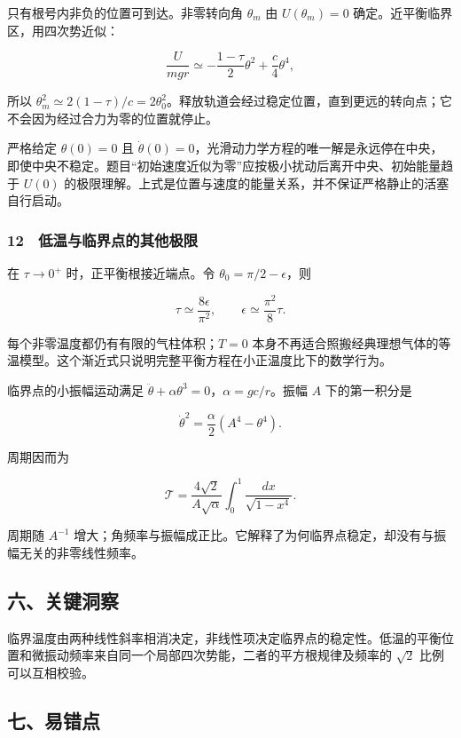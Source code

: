 \documentclass[12pt,a4paper,fontset=fandol]{ctexart}
\begin{document}
只有根号内非负的位置可到达。非零转向角 \(\theta_m\) 由 \(U(\theta_m)=0\)
确定。近平衡临界区，用四次势近似：

\[\frac{U}{mgr}\simeq-\frac{1-\tau}{2}\theta^2+\frac c4\theta^4,\]

所以
\(\theta_m^2\simeq2(1-\tau)/c=2\theta_0^2\)。释放轨道会经过稳定位置，直到更远的转向点；它不会因为经过合力为零的位置就停止。

严格给定 \(\theta(0)=0\) 且
\(\dot\theta(0)=0\)，光滑动力学方程的唯一解是永远停在中央，即使中央不稳定。题目``初始速度近似为零''应按极小扰动后离开中央、初始能量趋于
\(U(0)\)
的极限理解。上式是位置与速度的能量关系，并不保证严格静止的活塞自行启动。

\subsubsection{12　低温与临界点的其他极限}\label{ux4f4eux6e29ux4e0eux4e34ux754cux70b9ux7684ux5176ux4ed6ux6781ux9650}

在 \(\tau\to0^+\) 时，正平衡根接近端点。令
\(\theta_0=\pi/2-\epsilon\)，则

\[\tau\simeq\frac{8\epsilon}{\pi^2},\qquad
\epsilon\simeq\frac{\pi^2}{8}\tau.\]

每个非零温度都仍有有限的气柱体积；\(T=0\)
本身不再适合照搬经典理想气体的等温模型。这个渐近式只说明完整平衡方程在小正温度比下的数学行为。

临界点的小振幅运动满足
\(\ddot\theta+\alpha\theta^3=0\)，\(\alpha=gc/r\)。振幅 \(A\)
下的第一积分是

\[\dot\theta^2=\frac\alpha2(A^4-\theta^4).\]

周期因而为

\[\mathcal T=\frac{4\sqrt2}{A\sqrt\alpha}
\int_0^1\frac{dx}{\sqrt{1-x^4}}.\]

周期随 \(A^{-1}\)
增大；角频率与振幅成正比。它解释了为何临界点稳定，却没有与振幅无关的非零线性频率。

\subsection{六、关键洞察}\label{ux516dux5173ux952eux6d1eux5bdf-1}

临界温度由两种线性斜率相消决定，非线性项决定临界点的稳定性。低温的平衡位置和微振动频率来自同一个局部四次势能，二者的平方根规律及频率的
\(\sqrt2\) 比例可以互相校验。

\subsection{七、易错点}\label{ux4e03ux6613ux9519ux70b9-1}
\end{document}

